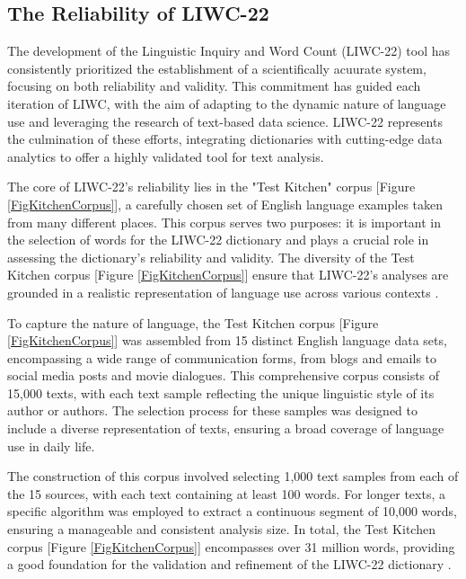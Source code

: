 \subsection{The Reliability of LIWC-22}

\quad The development of the Linguistic Inquiry and Word Count (LIWC-22) tool has consistently prioritized the establishment of a scientifically acuurate system, focusing on both reliability and validity. This commitment has guided each iteration of LIWC, with the aim of adapting to the dynamic nature of language use and leveraging the research of text-based data science. LIWC-22 represents the culmination of these efforts, integrating dictionaries with cutting-edge data analytics to offer a highly validated tool for text analysis.

The core of LIWC-22's reliability lies in the "Test Kitchen" corpus [Figure \ref{FigKitchenCorpus}], a carefully chosen set of English language examples taken from many different places. This corpus serves two purposes: it is important in the selection of words for the LIWC-22 dictionary and plays a crucial role in assessing the dictionary's reliability and validity. The diversity of the Test Kitchen corpus [Figure \ref{FigKitchenCorpus}] ensure that LIWC-22's analyses are grounded in a realistic representation of language use across various contexts \cite{boyd2022development}.

To capture the nature of language, the Test Kitchen corpus [Figure \ref{FigKitchenCorpus}] was assembled from 15 distinct English language data sets, encompassing a wide range of communication forms, from blogs and emails to social media posts and movie dialogues. This comprehensive corpus consists of 15,000 texts, with each text sample reflecting the unique linguistic style of its author or authors. The selection process for these samples was designed to include a diverse representation of texts, ensuring a broad coverage of language use in daily life.

The construction of this corpus involved selecting 1,000 text samples from each of the 15 sources, with each text containing at least 100 words. For longer texts, a specific algorithm was employed to extract a continuous segment of 10,000 words, ensuring a manageable and consistent analysis size. In total, the Test Kitchen corpus [Figure \ref{FigKitchenCorpus}] encompasses over 31 million words, providing a good foundation for the validation and refinement of the LIWC-22 dictionary \cite{boyd2022development}.

